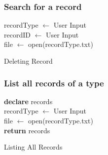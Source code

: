 \documentclass[12pt,a4paper]{article}
\begin{document}
        \subsubsection{Search for a record}
            \IncMargin{1em}
                \begin{algorithm}[H]
                    \SetAlgoLined
                    recordType $\leftarrow$ User Input \\
                    recordID $\leftarrow$ User Input \\
                    file $\leftarrow$ open(recordType.txt) \\
                     \caption{Deleting Record}
                \end{algorithm}
            \DecMargin{1em}
        \subsubsection{List all records of a type}
            \IncMargin{1em}
                \begin{algorithm}[H]
                    \SetAlgoLined
                    \textbf{declare} records \\
                    recordType $\leftarrow$ User Input \\
                    file $\leftarrow$ open(recordType.txt) \\
                    \textbf{return} records
                     \caption{Listing All Records}
                \end{algorithm}
            \DecMargin{1em}
\end{document}
